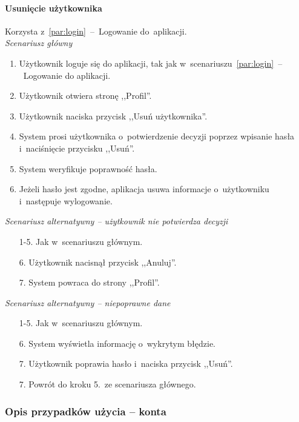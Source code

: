 \paragraph{Usunięcie użytkownika\newline}
\label{par:deleteUser}
Korzysta z~\ref{par:login}~--~Logowanie do~aplikacji.\\

\textit{Scenariusz główny}

\begin{enumerate}
\item Użytkownik loguje się do aplikacji, tak jak w~scenariuszu~\ref{par:login}~--~Logowanie do aplikacji.
\item Użytkownik otwiera stronę ,,Profil''.
\item Użytkownik naciska przycisk ,,Usuń użytkownika''.
\item System prosi użytkownika o~potwierdzenie decyzji poprzez wpisanie hasła i~naciśnięcie przycisku ,,Usuń''.
\item System weryfikuje poprawność hasła.
\item Jeżeli hasło jest zgodne, aplikacja usuwa informacje o~użytkowniku i~następuje wylogowanie.
\end{enumerate}

\textit{Scenariusz alternatywny -- użytkownik nie potwierdza decyzji}

\begin{enumerate}
\item[1-5.] Jak w~scenariuszu głównym.
\item[6.] Użytkownik nacisnął przycisk ,,Anuluj''.
\item[7.] System powraca do strony ,,Profil''.
\end{enumerate}

\textit{Scenariusz alternatywny -- niepoprawne dane}

\begin{enumerate}
\item[1-5.] Jak w~scenariuszu głównym.
\item[6.] System wyświetla informację o~wykrytym błędzie.
\item[7.] Użytkownik poprawia hasło i~naciska przycisk ,,Usuń''.
\item[7.] Powrót do kroku 5.~ze scenariusza głównego.
\end{enumerate}

\subsubsection{Opis przypadków użycia -- konta}
